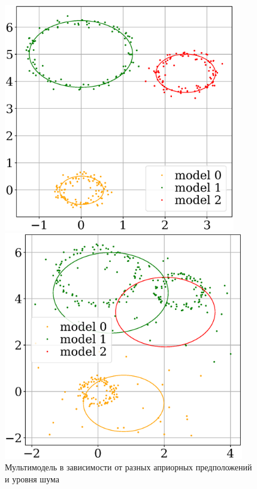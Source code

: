 \documentclass[12pt,twoside]{article}
\begin{document}
\begin{figure}[h!]
\begin{minipage}{.32\textwidth}
\end{minipage}
\begin{minipage}{.32\textwidth}
\hspace{2mm}
      \includegraphics[width =  0.9\textwidth]{911.eps}
\end{minipage}
\begin{minipage}{.32\textwidth}
\hspace{-2.3mm}
      \includegraphics[width =  0.935\textwidth]{912.eps}
\end{minipage}
\caption{Мультимодель в зависимости от разных априорных предположений и уровня шума}
\end{figure}
\end{document}
